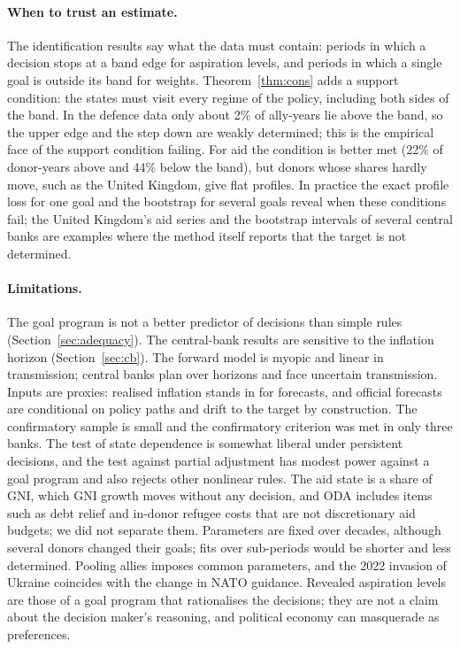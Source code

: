 \documentclass[11pt,a4paper]{article}
\theoremstyle{remark}\newtheorem{remark}{Remark}
\begin{document}
\paragraph{When to trust an estimate.} The identification results say what the data must contain: periods in which a decision stops at a band edge for aspiration levels, and periods in which a single goal is outside its band for weights. Theorem~\ref{thm:cons} adds a support condition: the states must visit every regime of the policy, including both sides of the band. In the defence data only about 2\% of ally-years lie above the band, so the upper edge and the step down are weakly determined; this is the empirical face of the support condition failing. For aid the condition is better met (22\% of donor-years above and 44\% below the band), but donors whose shares hardly move, such as the United Kingdom, give flat profiles. In practice the exact profile loss for one goal and the bootstrap for several goals reveal when these conditions fail; the United Kingdom's aid series and the bootstrap intervals of several central banks are examples where the method itself reports that the target is not determined.
\paragraph{Limitations.} The goal program is not a better predictor of decisions than simple rules (Section~\ref{sec:adequacy}). The central-bank results are sensitive to the inflation horizon (Section~\ref{sec:cb}). The forward model is myopic and linear in transmission; central banks plan over horizons and face uncertain transmission. Inputs are proxies: realised inflation stands in for forecasts, and official forecasts are conditional on policy paths and drift to the target by construction. The confirmatory sample is small and the confirmatory criterion was met in only three banks. The test of state dependence is somewhat liberal under persistent decisions, and the test against partial adjustment has modest power against a goal program and also rejects other nonlinear rules. The aid state is a share of GNI, which GNI growth moves without any decision, and ODA includes items such as debt relief and in-donor refugee costs that are not discretionary aid budgets; we did not separate them. Parameters are fixed over decades, although several donors changed their goals; fits over sub-periods would be shorter and less determined. Pooling allies imposes common parameters, and the 2022 invasion of Ukraine coincides with the change in NATO guidance. Revealed aspiration levels are those of a goal program that rationalises the decisions; they are not a claim about the decision maker's reasoning, and political economy can masquerade as preferences.
\end{document}
